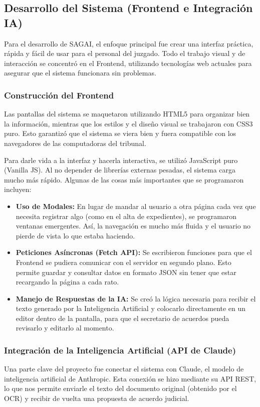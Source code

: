 \subsection{Desarrollo del Sistema (Frontend e Integración IA)}

Para el desarrollo de SAGAI, el enfoque principal fue crear una interfaz práctica, rápida y fácil de usar para el personal del juzgado. Todo el trabajo visual y de interacción se concentró en el Frontend, utilizando tecnologías web actuales para asegurar que el sistema funcionara sin problemas.

\subsubsection{Construcción del Frontend}
Las pantallas del sistema se maquetaron utilizando HTML5 para organizar bien la información, mientras que los estilos y el diseño visual se trabajaron con CSS3 puro. Esto garantizó que el sistema se viera bien y fuera compatible con los navegadores de las computadoras del tribunal.

Para darle vida a la interfaz y hacerla interactiva, se utilizó JavaScript puro (Vanilla JS). Al no depender de librerías externas pesadas, el sistema carga mucho más rápido. Algunas de las cosas más importantes que se programaron incluyen:
\begin{itemize}
    \item \textbf{Uso de Modales:} En lugar de mandar al usuario a otra página cada vez que necesita registrar algo (como en el alta de expedientes), se programaron ventanas emergentes. Así, la navegación es mucho más fluida y el usuario no pierde de vista lo que estaba haciendo.
    \item \textbf{Peticiones Asíncronas (Fetch API):} Se escribieron funciones para que el Frontend se pudiera comunicar con el servidor en segundo plano. Esto permite guardar y consultar datos en formato JSON sin tener que estar recargando la página a cada rato.
    \item \textbf{Manejo de Respuestas de la IA:} Se creó la lógica necesaria para recibir el texto generado por la Inteligencia Artificial y colocarlo directamente en un editor dentro de la pantalla, para que el secretario de acuerdos pueda revisarlo y editarlo al momento.
\end{itemize}

\subsubsection{Integración de la Inteligencia Artificial (API de Claude)}
Una parte clave del proyecto fue conectar el sistema con Claude, el modelo de inteligencia artificial de Anthropic. Esta conexión se hizo mediante su API REST, lo que nos permite enviarle el texto del documento original (obtenido por el OCR) y recibir de vuelta una propuesta de acuerdo judicial.

